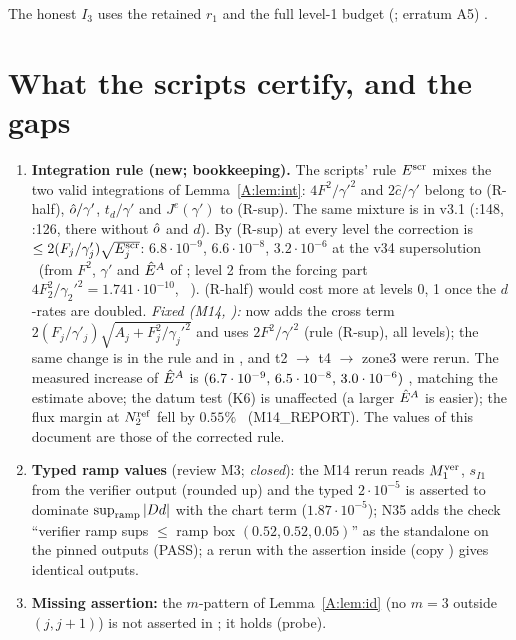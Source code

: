 \documentclass[11pt]{article}
\begin{document}
\noindent The honest $I_3$ uses the retained $r_1$ and the full level-1 budget (; erratum A5) \tC.

\section{What the scripts certify, and the gaps}\label{A:sec:gaps}
\begin{enumerate}[label=(G-A\arabic*),leftmargin=3.4em]
\item \textbf{Integration rule (new; bookkeeping).} The scripts' rule $E^{\rm scr}$ mixes the two valid integrations of Lemma~\ref{A:lem:int}: $4F^2/\gamma'^2$ and $2\hat c/\gamma'$ belong to (R-half), $\hat o/\gamma'$, $t_d/\gamma'$ and $J^e(\gamma')$ to (R-sup). The same mixture is in v3.1 (:148, :126, there without $\hat o$ and $d$). By (R-sup) at every level the correction is $\le2(F_j/\gamma'_j)\sqrt{E^{\rm scr}_j}$: $6.8\cdot10^{-9}$, $6.6\cdot10^{-8}$, $3.2\cdot10^{-6}$ at the v34 supersolution \tE\ (from $F^2$, $\gamma'$ and $\hat E^A$ of ; level 2 from the forcing part $4F_2^2/\gamma_2'^2=1.741\cdot10^{-10}$, \SA\ ). (R-half) would cost more at levels 0, 1 once the $d$-rates are doubled. \emph{Fixed (M14, ):}  now adds the cross term $2(F_j/\gamma'_j)\sqrt{A_j+F_j^2/\gamma_j'^2}$ and uses $2F^2/\gamma'^2$ (rule (R-sup), all levels); the same change is in the rule  and in , and t2 $\to$ t4 $\to$ zone3 were rerun. The measured increase of $\hat E^A$ is $(6.7\cdot10^{-9},\,6.5\cdot10^{-8},\,3.0\cdot10^{-6})$ \tE, matching the estimate above; the datum test (K6) is unaffected (a larger $\hat E^A$ is easier); the flux margin at $N_2^{\rm ref}$ fell by $0.55\%$ \tE\ (M14\_REPORT). The values of this document are those of the corrected rule.
\item \textbf{Typed ramp values} (review M3; \emph{closed}): the M14 rerun reads $M_1^{\rm ver}$, $s_{I1}$ from the verifier output (rounded up) and the typed $2\cdot10^{-5}$ is asserted to dominate $\sup_{\rm ramp}|Dd|$ with the chart term ($1.87\cdot10^{-5}$); N35 adds the check ``verifier ramp sups $\le$ ramp box $(0.52,0.52,0.05)$'' as the standalone  on the pinned outputs (PASS); a rerun with the assertion inside  (copy ) gives identical outputs.
\item \textbf{Missing assertion:} the $m$-pattern of Lemma~\ref{A:lem:id} (no $m=3$ outside $(j,j+1)$) is not asserted in ; it holds (probe).

\end{enumerate}
\end{document}
